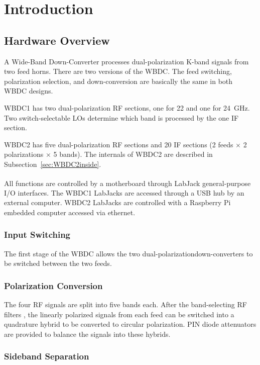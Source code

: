 \documentclass[letterpaper,11pt]{book}
\begin{document}
\mainmatter
\chapter{Introduction}\label{chap:intro}

\section{Hardware Overview}

A Wide-Band Down-Converter processes dual-polarization K-band signals from two
feed horns. There are two versions of the WBDC.
The feed switching, polarization selection, and down-conversion are basically 
the same in both WBDC designs.

WBDC1 has two dual-polarization RF sections, one for 22 and one for 24~GHz.
Two switch-selectable LOs determine which band is processed by the one IF section. 

WBDC2 has five dual-polarization RF sections and 20 IF 
sections (2 feeds $\times$ 2 polarizations $\times$ 5 bands).
The internals of WBDC2 are described in Subsection~\ref{sec:WBDC2inside}.

All functions are controlled by a motherboard
through LabJack\textsuperscript{\textregistered} general-purpose I/O 
interfaces.
The WBDC1 LabJacks are accessed through a USB hub by an external computer.  
WBDC2 LabJacks are controlled with a Raspberry Pi embedded computer accessed 
via ethernet.

\subsection{Input Switching}

The first stage of the WBDC allows the two dual-polarizationdown-converters to
be switched between the two feeds.  

\subsection{Polarization Conversion}

The four RF signals are split into five bands each.  After the band-selecting 
RF filters , the linearly polarized signals from each
feed can be switched into a quadrature hybrid  to be converted to circular
polarization.  PIN diode attenuators are provided  to balance the signals into
these hybrids.

\subsection{Sideband Separation}
\end{document}

